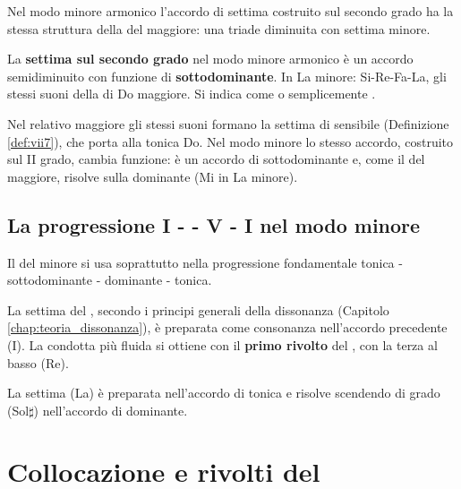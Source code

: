 Nel modo minore armonico l'accordo di settima costruito sul secondo grado ha la stessa struttura della  del maggiore: una triade diminuita con settima minore.

\begin{definizione}
	\label{def:ii7_minore}
	La \textbf{settima sul secondo grado} nel modo minore armonico è un accordo semidiminuito con funzione di \textbf{sottodominante}. In La minore: Si-Re-Fa-La, gli stessi suoni della  di Do maggiore. Si indica come  o semplicemente .
\end{definizione}

Nel relativo maggiore gli stessi suoni formano la settima di sensibile (Definizione \ref{def:vii7}), che porta alla tonica Do. Nel modo minore lo stesso accordo, costruito sul II grado, cambia funzione: è un accordo di sottodominante e, come il  del maggiore, risolve sulla dominante (Mi in La minore).

\subsection{La progressione I -  - V - I nel modo minore}
\label{subsec:progressione_ii7}

Il  del minore si usa soprattutto nella progressione fondamentale tonica - sottodominante - dominante - tonica.

\begin{regola}
	\label{reg:preparazione_ii7}
	La settima del , secondo i principi generali della dissonanza (Capitolo \ref{chap:teoria_dissonanza}), è preparata come consonanza nell'accordo precedente (I). La condotta più fluida si ottiene con il \textbf{primo rivolto} del , con la terza al basso (Re).
\end{regola}

\begin{esempio}
	\label{ex:progressione_ii7_minore}
	La settima (La) è preparata nell'accordo di tonica e risolve scendendo di grado (Sol$\sharp$) nell'accordo di dominante.
\end{esempio}

\section{Collocazione e rivolti del }
\label{subsec:rivolti_ii7_minore}

